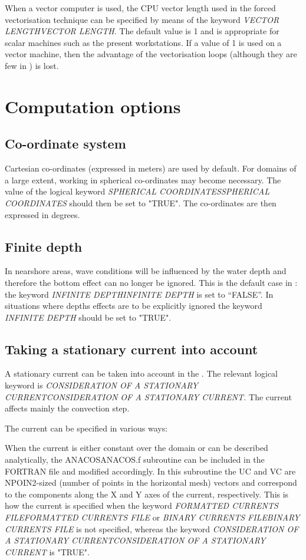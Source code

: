  When a vector computer is used, the CPU vector length used in the forced vectorisation technique can be specified by means of the keyword \textit{VECTOR LENGTHVECTOR LENGTH}. The default value is 1 and is appropriate for scalar machines such as the present workstations. If a value of 1 is used on a vector machine, then the advantage of the vectorisation loops (although they are few in \tomawac) is lost.


\section{ Computation options}


\subsection{ Co-ordinate system}

 Cartesian co-ordinates (expressed in meters) are used by default. For domains of a large extent, working in spherical co-ordinates may become necessary. The value of the logical keyword \textit{SPHERICAL COORDINATESSPHERICAL COORDINATES} should then be set to "TRUE". The co-ordinates are then expressed in degrees.


\subsection{ Finite depth }

 In nearshore areas, wave conditions will be influenced by the water depth and therefore the bottom effect can no longer be ignored. This is the default case in \tomawac: the keyword \textit{INFINITE DEPTHINFINITE DEPTH }is set to ``FALSE''. In situations where depths effects are to be explicitly ignored the keyword \textit{INFINITE DEPTH} should be set to "TRUE".


\subsection{ Taking a stationary current into account}

 A stationary current can be taken into account in the \tomawac. The relevant logical keyword is \textit{CONSIDERATION OF A STATIONARY CURRENTCONSIDERATION OF A STATIONARY CURRENT. }The current affects mainly the convection step.

 The current can be specified in various ways:

 When the current is either constant over the domain or can be described analytically, the ANACOSANACOS.f subroutine can be included in the FORTRAN file and modified accordingly. In this subroutine the UC and VC are NPOIN2-sized (number of points in the horizontal mesh) vectors and correspond to the components along the X and Y axes of the current, respectively. This is how the current is specified when the keyword \textit{FORMATTED CURRENTS FILEFORMATTED CURRENTS FILE} or \textit{BINARY CURRENTS FILEBINARY CURRENTS FILE }is not specified, whereas the keyword \textit{CONSIDERATION OF A STATIONARY CURRENTCONSIDERATION OF A STATIONARY CURRENT} is "TRUE".

